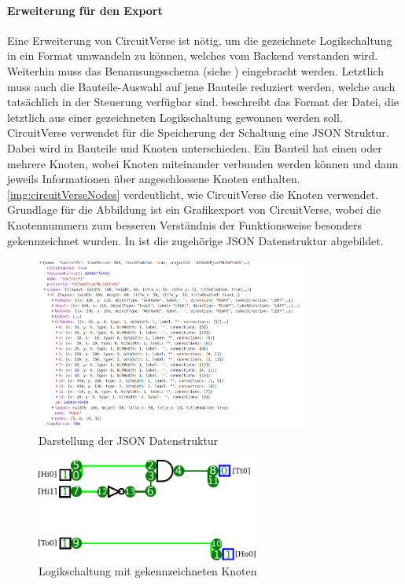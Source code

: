 \paragraph{Erweiterung für den Export}\label{par:erw}
 Eine Erweiterung von CircuitVerse ist nötig, um die gezeichnete Logikschaltung in ein Format umwandeln zu können, welches vom Backend verstanden wird. Weiterhin muss das Benamsungsschema (siehe ) eingebracht werden. Letztlich muss auch die Bauteile-Auswahl auf jene Bauteile reduziert werden, welche auch tatsächlich in der Steuerung verfügbar sind.  beschreibt das Format der Datei, die letztlich aus einer gezeichneten Logikschaltung gewonnen werden soll. CircuitVerse verwendet für die Speicherung der Schaltung eine JSON Struktur. Dabei wird in Bauteile und Knoten unterschieden. Ein Bauteil hat einen oder mehrere Knoten, wobei Knoten miteinander verbunden werden können und dann jeweils Informationen über angeschlossene Knoten enthalten. \autoref{img:circuitVerseNodes} verdeutlicht, wie CircuitVerse die Knoten verwendet. Grundlage für die Abbildung ist ein Grafikexport von CircuitVerse, wobei die Knotennummern zum besseren Verständnis der Funktionsweise besonders gekennzeichnet wurden. In  ist die zugehörige JSON Datenstruktur abgebildet.
 \begin{figure}[H]
 	\begin{center}
 		\includegraphics[width=0.8\textwidth ,clip]{./images/circuitverseLogicJson.png}
 		\caption{Darstellung der JSON Datenstruktur}
 		\label{img:circuitVerseJson}
 	\end{center} 
 \end{figure}	
 
 \begin{figure}[H]
 	\begin{center}
 		\includegraphics[width=0.65\textwidth ,clip]{./images/circuitverseLogicNodes.pdf}
 		\caption{Logikschaltung mit gekennzeichneten Knoten}
 		\label{img:circuitVerseNodes}
 	\end{center} 
 \end{figure}	
 
